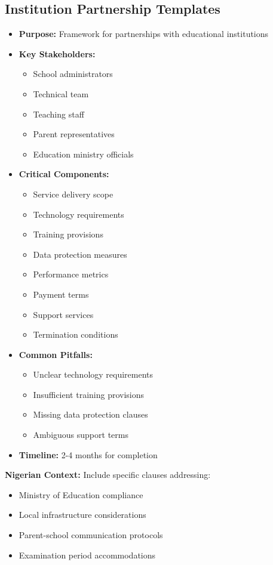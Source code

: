 \subsection{Institution Partnership Templates}
\begin{tcolorbox}[colback=white,colframe=primarydark,title=\textbf{Educational Institution Partnerships}]
\begin{itemize}
    \item \textbf{Purpose:} Framework for partnerships with educational institutions
    \item \textbf{Key Stakeholders:}
    \begin{itemize}
        \item School administrators
        \item Technical team
        \item Teaching staff
        \item Parent representatives
        \item Education ministry officials
    \end{itemize}
    \item \textbf{Critical Components:}
    \begin{itemize}
        \item Service delivery scope
        \item Technology requirements
        \item Training provisions
        \item Data protection measures
        \item Performance metrics
        \item Payment terms
        \item Support services
        \item Termination conditions
    \end{itemize}
    \item \textbf{Common Pitfalls:}
    \begin{itemize}
        \item Unclear technology requirements
        \item Insufficient training provisions
        \item Missing data protection clauses
        \item Ambiguous support terms
    \end{itemize}
    \item \textbf{Timeline:} 2-4 months for completion
\end{itemize}

\textbf{Nigerian Context:}
Include specific clauses addressing:
\begin{itemize}
    \item Ministry of Education compliance
    \item Local infrastructure considerations
    \item Parent-school communication protocols
    \item Examination period accommodations
\end{itemize}
\end{tcolorbox}


